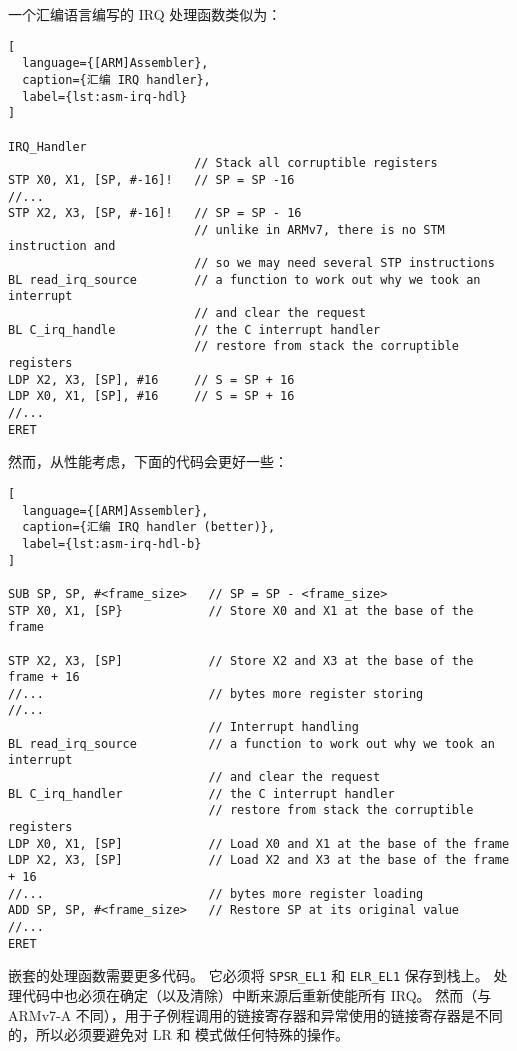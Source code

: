 
一个汇编语言编写的 IRQ 处理函数类似为：

\begin{lstlisting}[
  language={[ARM]Assembler},
  caption={汇编 IRQ handler},
  label={lst:asm-irq-hdl}
]

IRQ_Handler
                          // Stack all corruptible registers
STP X0, X1, [SP, #-16]!   // SP = SP -16
//...
STP X2, X3, [SP, #-16]!   // SP = SP - 16
                          // unlike in ARMv7, there is no STM instruction and
                          // so we may need several STP instructions
BL read_irq_source        // a function to work out why we took an interrupt
                          // and clear the request
BL C_irq_handle           // the C interrupt handler
                          // restore from stack the corruptible registers
LDP X2, X3, [SP], #16     // S = SP + 16
LDP X0, X1, [SP], #16     // S = SP + 16
//...
ERET
\end{lstlisting}

然而，从性能考虑，下面的代码会更好一些：

\begin{lstlisting}[
  language={[ARM]Assembler},
  caption={汇编 IRQ handler (better)},
  label={lst:asm-irq-hdl-b}
]

SUB SP, SP, #<frame_size>   // SP = SP - <frame_size>
STP X0, X1, [SP}            // Store X0 and X1 at the base of the frame

STP X2, X3, [SP]            // Store X2 and X3 at the base of the frame + 16
//...                       // bytes more register storing
//...
                            // Interrupt handling
BL read_irq_source          // a function to work out why we took an interrupt
                            // and clear the request
BL C_irq_handler            // the C interrupt handler
                            // restore from stack the corruptible registers
LDP X0, X1, [SP]            // Load X0 and X1 at the base of the frame
LDP X2, X3, [SP]            // Load X2 and X3 at the base of the frame + 16
//...                       // bytes more register loading
ADD SP, SP, #<frame_size>   // Restore SP at its original value
//...
ERET 
\end{lstlisting}


嵌套的处理函数需要更多代码。
它必须将 \lstinline!SPSR_EL1! 和 \lstinline!ELR_EL1! 保存到栈上。
处理代码中也必须在确定（以及清除）中断来源后重新使能所有 IRQ。
然而（与 ARMv7-A 不同），用于子例程调用的链接寄存器和异常使用的链接寄存器是不同的，所以必须要避免对 LR 和 模式做任何特殊的操作。


